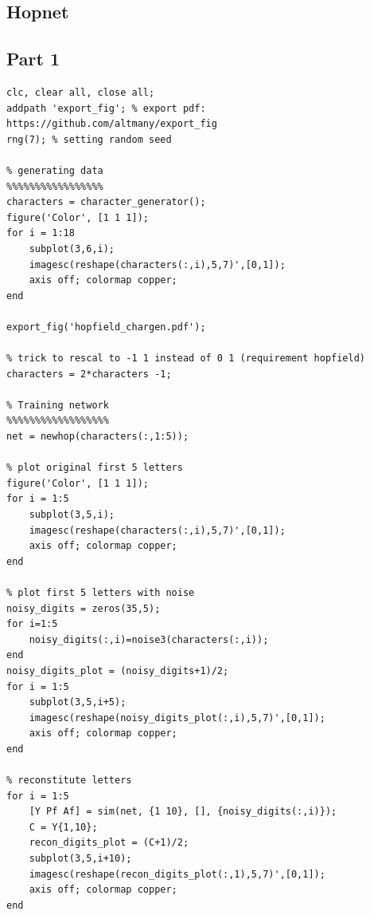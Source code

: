 \documentclass[11pt, a4paper]{article}
\begin{document}
% 
\newpage
\begin{appendices}
\section{Hopnet}
\subsection{Part 1}
\begin{lstlisting}
clc, clear all, close all;
addpath 'export_fig'; % export pdf: https://github.com/altmany/export_fig
rng(7); % setting random seed

% generating data
%%%%%%%%%%%%%%%%%
characters = character_generator();
figure('Color', [1 1 1]);
for i = 1:18
    subplot(3,6,i);
    imagesc(reshape(characters(:,i),5,7)',[0,1]);
    axis off; colormap copper;
end

export_fig('hopfield_chargen.pdf');

% trick to rescal to -1 1 instead of 0 1 (requirement hopfield)
characters = 2*characters -1;

% Training network
%%%%%%%%%%%%%%%%%%
net = newhop(characters(:,1:5));

% plot original first 5 letters
figure('Color', [1 1 1]);
for i = 1:5
    subplot(3,5,i);
    imagesc(reshape(characters(:,i),5,7)',[0,1]);
    axis off; colormap copper;
end

% plot first 5 letters with noise
noisy_digits = zeros(35,5);
for i=1:5
    noisy_digits(:,i)=noise3(characters(:,i));
end
noisy_digits_plot = (noisy_digits+1)/2;
for i = 1:5
    subplot(3,5,i+5);
    imagesc(reshape(noisy_digits_plot(:,i),5,7)',[0,1]);
    axis off; colormap copper;
end

% reconstitute letters
for i = 1:5
    [Y Pf Af] = sim(net, {1 10}, [], {noisy_digits(:,i)});
    C = Y{1,10};
    recon_digits_plot = (C+1)/2;
    subplot(3,5,i+10);
    imagesc(reshape(recon_digits_plot(:,1),5,7)',[0,1]);
    axis off; colormap copper;
end
\end{lstlisting}

\end{appendices}
\end{document}
